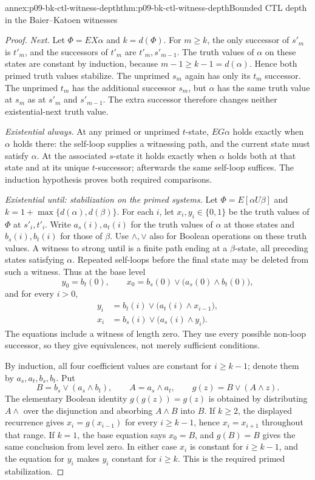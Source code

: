 \begin{annexitem}{annex:p09-bk-ctl-witness-depth}{thm:p09-bk-ctl-witness-depth}{Bounded CTL depth in the Baier--Katoen witnesses}
\begin{proof}
\emph{Next.} Let \(\Phi=EX\alpha\) and \(k=d(\Phi)\).
For \(m\geq k\), the only successor of \(s'_m\) is \(t'_m\),
and the successors of \(t'_m\) are \(t'_m,s'_{m-1}\).
The truth values of \(\alpha\) on these states are constant by
induction, because \(m-1\geq k-1=d(\alpha)\). Hence both primed
truth values stabilize. The unprimed \(s_m\) again has only its
\(t_m\) successor. The unprimed \(t_m\) has the additional successor
\(s_m\), but \(\alpha\) has the same truth value at \(s_m\) as
at \(s'_m\) and \(s'_{m-1}\). The extra successor therefore changes
neither existential-next truth value.

\emph{Existential always.} At any primed or unprimed \(t\)-state,
\(EG\alpha\) holds exactly when \(\alpha\) holds there: the
self-loop supplies a witnessing path, and the current state must
satisfy \(\alpha\). At the associated \(s\)-state it holds exactly
when \(\alpha\) holds both at that state and at its unique
\(t\)-successor; afterwards the same self-loop suffices. The
induction hypothesis proves both required comparisons.

\emph{Existential until: stabilization on the primed systems.}
Let \(\Phi=E[\alpha U\beta]\) and
\(k=1+\max\{d(\alpha),d(\beta)\}\). For each \(i\), let
\(x_i,y_i\in\{0,1\}\) be the truth values of \(\Phi\) at
\(s'_i,t'_i\). Write \(a_s(i),a_t(i)\) for the truth values of
\(\alpha\) at those states and \(b_s(i),b_t(i)\) for those of
\(\beta\). Use \(\land,\lor\) also for Boolean operations on
these truth values. A witness to strong until is a finite path ending
at a \(\beta\)-state, all preceding states satisfying \(\alpha\).
Repeated self-loops before the final state may be deleted from such
a witness. Thus at the base level
\[
 y_0=b_t(0),\qquad
 x_0=b_s(0)\lor\bigl(a_s(0)\land b_t(0)\bigr),
\]
and for every \(i>0\),
\[
\begin{aligned}
 y_i&=b_t(i)\lor\bigl(a_t(i)\land x_{i-1}\bigr),\\
 x_i&=b_s(i)\lor\bigl(a_s(i)\land y_i\bigr).
\end{aligned}
\]
The equations include a witness of length zero. They use every possible
non-loop successor, so they give equivalences, not merely sufficient
conditions.

By induction, all four coefficient values are constant for
\(i\geq k-1\); denote them by \(a_s,a_t,b_s,b_t\). Put
\[
 B=b_s\lor(a_s\land b_t),\qquad A=a_s\land a_t,
 \qquad g(z)=B\lor(A\land z).
\]
The elementary Boolean identity \(g(g(z))=g(z)\) is obtained by
distributing \(A\land\) over the disjunction and absorbing
\(A\land B\) into \(B\). If \(k\geq2\), the displayed recurrence
gives \(x_i=g(x_{i-1})\) for every \(i\geq k-1\), hence
\(x_i=x_{i+1}\) throughout that range. If \(k=1\), the base
equation says \(x_0=B\), and \(g(B)=B\) gives the same conclusion
from level zero. In either case \(x_i\) is constant for
\(i\geq k-1\), and the equation for \(y_i\) makes \(y_i\)
constant for \(i\geq k\). This is the required primed stabilization.


\end{proof}
\end{annexitem}
